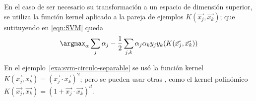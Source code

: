 En el caso de ser necesario su transformación a un espacio de dimensión superior, se utiliza la función kernel aplicado a la pareja de ejemplos $K(\vec{x_j}, \vec{x_k})$; que sutituyendo en \eqref{eqn:SVM} queda
\begin{equation}
\argmax_\alpha \sum_j \alpha_j - \frac{1}{2} \sum_{j,k}\alpha_j \alpha_k y_j y_k (K(\vec{x_j},\vec{x_k}))
\label{eqn:SVM-kerneled}
\end{equation}

En el ejemplo~\ref{exa:svm-circulo-separable} se usó la función kernel $K(\vec{x_j},\vec{x_k})=(\vec{x_j}\cdot\vec{x_k})^2$; pero se pueden usar otras \citep{Russell2009}, como el kernel polinómico $K(\vec{x_j},\vec{x_k})=(1+\vec{x_j}\cdot\vec{x_k})^d$.

